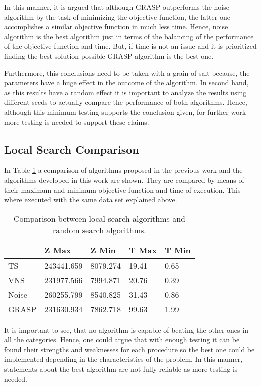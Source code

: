 \documentclass[10pt,twoside]{article}
\begin{document}
In this manner, it is argued that although GRASP outperforms the
noise algorithm by the task of minimizing the objective function,
the latter one accomplishes a similar objective function in much less
time. Hence, noise algorithm is the best algorithm just in terms of
the balancing of the performance of the objective function and
time. But, if time is not an issue and it is prioritized finding
the best solution possible GRASP algorithm is the best one.

Furthermore, this conclusions need to be taken with a grain of salt
because, the parameters have a huge effect in the outcome of the
algorithm. In second hand, as this results have a random effect it is
important to analyze the results using different seeds to actually
compare the performance of both algorithms. Hence, although this
minimum testing supports the conclusion given, for further work more
testing is needed to support these claims.

\subsection{Local Search Comparison}\label{sec_param}
In Table \ref{tab:2} a comparison of algorithms proposed in the
previous work and the algorithms developed in this work are
shown. They are compared by means of their maximum and minimum
objective function and time of execution. This where executed with
the same data set explained above.

\begin{table}[H]
\centering
\begin{tabular}{lllll}
\hline
      & Z Max      & Z Min    & T Max & T Min \\ \hline
TS    & 243441.659 & 8079.274 & 19.41 & 0.65  \\
VNS   & 231977.566 & 7994.871 & 20.76 & 0.39  \\
Noise & 260255.799 & 8540.825 & 31.43 & 0.86  \\
GRASP & 231630.934 & 7862.718 & 99.63 & 1.99  \\ \hline
\end{tabular}
\caption{Comparison between local search algorithms and random search algorithms.}
\label{tab:2}
\end{table}

It is important to see, that no algorithm is capable of beating the
other ones in all the categories. Hence, one could argue that with
enough testing it can be found their strengths and weaknesses for
each procedure so the best one could be implemented depending in the
characteristics of the problem. In this manner, statements about the
best algorithm are not fully reliable as more testing is needed.
\end{document}
